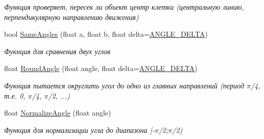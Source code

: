 \begin{Indent}
\begin{DoxyCompactItemize}
\begin{DoxyCompactList}\small\item\em Функция проверяет, пересек ли объект центр клетки (центральную линию, перпендикулярную направлению движения) \end{DoxyCompactList}\item 
bool \hyperlink{namespacertm_abf5da499525e88711c6edfb76314f90b}{Same\+Angles} (float a, float b, float delta=\hyperlink{namespacertm_ac78c5105838adb58682cb69a4c66efd7}{A\+N\+G\+L\+E\+\_\+\+D\+E\+L\+TA})
\begin{DoxyCompactList}\small\item\em Фукнция для сравнения двух углов \end{DoxyCompactList}\item 
float \hyperlink{namespacertm_a2c9be06724a54815f6f2f638cf9ae613}{Round\+Angle} (float angle, float delta=\hyperlink{namespacertm_ac78c5105838adb58682cb69a4c66efd7}{A\+N\+G\+L\+E\+\_\+\+D\+E\+L\+TA})
\begin{DoxyCompactList}\small\item\em Фукнция пытается округлить угол до одно из главных направлений (период {$\pi$}/4, т.\+е. 0, {$\pi$}/4, {$\pi$}/2, ...) \end{DoxyCompactList}\item 
float \hyperlink{namespacertm_a72a57dbe581a6743525e1920296d42fe}{Normalize\+Angle} (float angle)
\begin{DoxyCompactList}\small\item\em Функция для нормализации угла до диапазона \mbox{[}-\/{$\pi$}/2;{$\pi$}/2) \end{DoxyCompactList}\end{DoxyCompactItemize}
\end{Indent}
